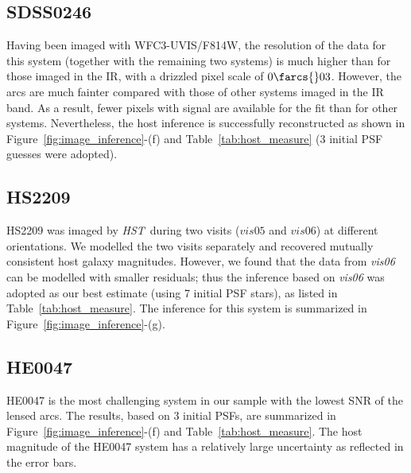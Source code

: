 \documentclass[fleqn,usenatbib]{mnras}
\newcommand{\hst}{{\it HST}}
\begin{document}
{\subsection{SDSS0246}
Having been imaged with WFC3-UVIS/F814W, the resolution of the data for this system (together with the remaining two systems) is much higher than for those imaged in the IR, with a drizzled pixel scale of $0\farcs{}03$. However, the arcs are much fainter compared with those of other systems imaged in the IR band. As a result, fewer pixels with signal are available for the fit than for other systems. Nevertheless, the host inference is successfully reconstructed as shown in Figure~\ref{fig:image_inference}-(f) and Table~\ref{tab:host_measure} (3 initial PSF guesses were adopted).  

\subsection{HS2209}
HS2209 was imaged by \hst\ during two visits ($vis05$ and $vis06$) at different orientations. We modelled the two visits separately and recovered mutually consistent host galaxy magnitudes. However, we found that the data from {\it vis06} can be modelled with smaller residuals; thus the inference based on {\it vis06} was adopted as our best estimate (using 7 initial PSF stars), as listed in Table~\ref{tab:host_measure}. The inference for this system is summarized in Figure~\ref{fig:image_inference}-(g).

\subsection{HE0047}
HE0047 is the most challenging system in our sample with the lowest SNR of the lensed arcs. The results, based on 3 initial PSFs, are summarized in Figure~\ref{fig:image_inference}-(f) and Table~\ref{tab:host_measure}. The host magnitude of the HE0047 system has a relatively large uncertainty as reflected in the error bars.

}
\end{document}
